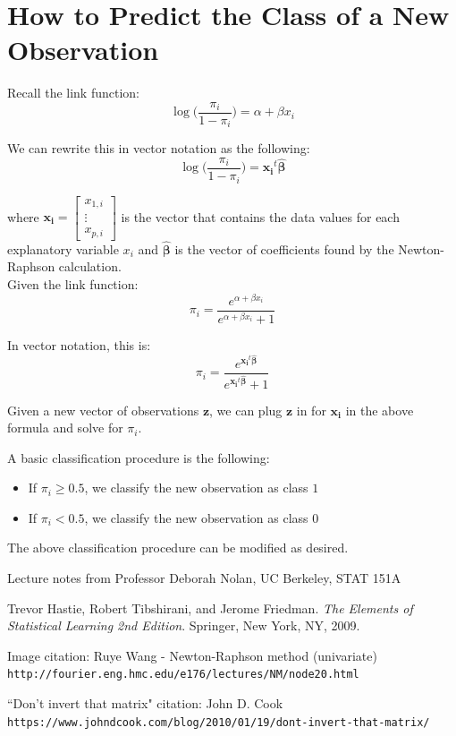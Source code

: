 \documentclass{article}
\begin{document}
\section{How to Predict the Class of a New Observation}

Recall the link function: 
$$
\log \big( \dfrac{\pi_i}{1-\pi_i} \big) = \alpha + \beta x_i
$$

\noindent We can rewrite this in vector notation as the following:
$$
\log \big( \dfrac{\pi_i}{1-\pi_i} \big) = \boldsymbol{x_i}^t \boldsymbol{\hat{\beta}}
$$

where $\boldsymbol{x_i} = \begin{bmatrix} 
    x_{1,i} \\
    \vdots \\
    x_{p,i}
    \end{bmatrix}$ is the vector that contains the data values for each explanatory variable $x_i$ and $\boldsymbol{\hat{\beta}}$ is the vector of coefficients found by the Newton-Raphson calculation.\\
    
\noindent Given the link function:
$$
\pi_i = \dfrac{e^{\alpha + \beta x_i}}{e^{\alpha + \beta x_i} + 1}
$$

\noindent In vector notation, this is:
$$
\pi_i = \dfrac{e^{\boldsymbol{x_i}^t \boldsymbol{\hat{\beta}}}}{e^{\boldsymbol{x_i}^t \boldsymbol{\hat{\beta}}} + 1}
$$

\noindent Given a new vector of observations $\boldsymbol{z}$, we can plug $\boldsymbol{z}$ in for $\boldsymbol{x_i}$ in the above formula and solve for $\pi_i$. 

A basic classification procedure is the following:

\begin{itemize}
    \item If $\pi_i \geq 0.5$, we classify the new observation as class $1$
    \item If $\pi_i < 0.5$, we classify the new observation as class $0$
\end{itemize}

\noindent The above classification procedure can be modified as desired.


\begin{thebibliography}{9}

Lecture notes from Professor Deborah Nolan, UC Berkeley, STAT 151A

Trevor Hastie, Robert Tibshirani, and Jerome Friedman. 
\textit{The Elements of Statistical Learning 2nd Edition}. 
Springer, New York, NY, 2009.

Image citation: Ruye Wang - Newton-Raphson method (univariate)
\\\texttt{http://fourier.eng.hmc.edu/e176/lectures/NM/node20.html}

``Don't invert that matrix" citation: John D. Cook
\\\texttt{https://www.johndcook.com/blog/2010/01/19/dont-invert-that-matrix/}
\end{thebibliography}
\end{document}
